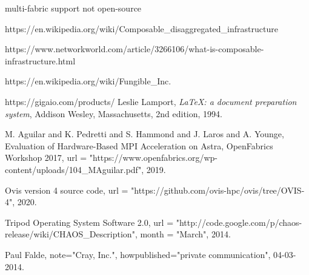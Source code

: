 \documentclass[conference]{IEEEtran}
\begin{document}
\begin{thebibliography}{20}
multi-fabric support not open-source

https://en.wikipedia.org/wiki/Composable_disaggregated_infrastructure

https://www.networkworld.com/article/3266106/what-is-composable-infrastructure.html

https://en.wikipedia.org/wiki/Fungible_Inc.

https://gigaio.com/products/  
  Leslie Lamport,
  \textit{\LaTeX: a document preparation system},
  Addison Wesley, Massachusetts, 
  2nd edition,
  1994.

  M. Aguilar and K. Pedretti and S. Hammond and J. Laros and A. Younge,
  {E}valuation of {H}ardware-{B}ased {MPI} {A}cceleration on {A}stra,
  {O}pen{F}abrics {W}orkshop 2017,
  url = "https://www.openfabrics.org/wp-content/uploads/104{\_}MAguilar.pdf",
  2019.

  {O}vis version 4 source code,
  url = "https://github.com/ovis-hpc/ovis/tree/OVIS-4",
  2020.

  {T}ripod {O}perating {S}ystem {S}oftware 2.0,
  url = "http://code.google.com/p/chaos-release/wiki/CHAOS_Description",
  month = "March",
  2014.

  Paul Falde,
  note="{Cray, Inc.}",
  howpublished="private communication",
  04-03-2014.


\end{thebibliography}
\end{document}
